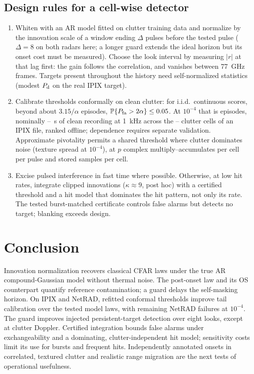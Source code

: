\documentclass[journal]{IEEEtran}
\newcommand{\PP}{\mathbb{P}}
\begin{document}
\subsection{Design rules for a cell-wise detector}
\begin{enumerate}[leftmargin=*,itemsep=0pt]
\item Whiten with an AR model fitted on clutter training data and normalize by the innovation scale of a window ending $\Delta$ pulses before the tested pulse ($\Delta=8$ on both radars here; a longer guard extends the ideal horizon but its onset cost must be measured). Choose the look interval by measuring $|r|$ at that lag first: the gain follows the correlation, and vanishes between 77~GHz frames. Targets present throughout the history need self-normalized statistics (modest $P_{\rm d}$ on the real IPIX target).
\item Calibrate thresholds conformally on clean clutter: for i.i.d.\ continuous scores, beyond about $3.15/\alpha$ episodes, $\PP\{P_{\rm fa}>2\alpha\}\le0.05$. At $10^{-4}$ that is \CalEpisodesFour{} episodes, nominally \CalSecondsMin--\CalSecondsMax~s of clean recording at 1~kHz across the \CalCellsMin--\CalCellsMax{} clutter cells of an IPIX file, ranked offline; dependence requires separate validation. Approximate pivotality permits a shared threshold where clutter dominates noise (texture spread \LInConfSpreadFour{} at $10^{-4}$), at $p$ complex multiply--accumulates per cell per pulse and \StatePerCell{} stored samples per cell.
\item Excise pulsed interference in fast time where possible. Otherwise, at low hit rates, integrate clipped innovations ($\kappa\approx9$, post hoc) with a certified threshold and a hit model that dominates the hit pattern, not only its rate. The tested burst-matched certificate controls false alarms but detects no target; blanking exceeds design.
\end{enumerate}

\section{Conclusion}
Innovation normalization recovers classical CFAR laws under the true AR compound-Gaussian model without thermal noise. The post-onset law and its OS counterpart quantify reference contamination; a guard delays the self-masking horizon. On IPIX and NetRAD, refitted conformal thresholds improve tail calibration over the tested model laws, with remaining NetRAD failures at $10^{-4}$. The guard improves injected persistent-target detection over eight looks, except at clutter Doppler. Certified integration bounds false alarms under exchangeability and a dominating, clutter-independent hit model; sensitivity costs limit its use for bursts and frequent hits. Independently annotated onsets in correlated, textured clutter and realistic range migration are the next tests of operational usefulness.
\end{document}
